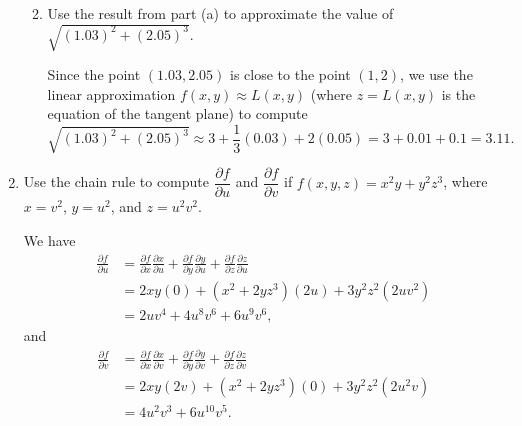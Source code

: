 \documentclass[12pt]{article}
\newcommand{\points}[1]{\marginpar{\hspace{24pt}[#1]}}
\begin{document}
\begin{enumerate}
\begin{enumerate}
\bigskip

\bigskip

\item Use the result from part (a) to approximate the value of $\sqrt{(1.03)^2+(2.05)^3}$. \points{2}

\bigskip

Since the point $(1.03, 2.05)$ is close to the point $(1,2)$, we use the linear approximation $f(x,y)\approx L(x,y)$ (where $z=L(x,y)$ is the equation of the tangent plane) to compute
\[
 \sqrt{(1.03)^2+(2.05)^3}\approx 3+\frac{1}{3}(0.03)+2(0.05) = 3+0.01+0.1 = 3.11.
\]

\end{enumerate} 

\bigskip


\item Use the chain rule to compute $\dfrac{\partial f}{\partial u}$ and $\dfrac{\partial f}{\partial v}$ if $f(x,y,z) = x^2y+y^2z^3$, where $x = v^2$, $y=u^2$, and $z=u^2v^2$. \points{5}

\bigskip

We have
\begin{align*}
 \frac{\partial f}{\partial u} & = \frac{\partial f}{\partial x}\frac{\partial x}{\partial u} + \frac{\partial f}{\partial y}\frac{\partial y}{\partial u} + \frac{\partial f}{\partial z}\frac{\partial z}{\partial u}\\
& = 2xy(0)+ (x^2+2yz^3)(2u) + 3y^2z^2(2uv^2)\\
& = 2uv^4+4u^8v^6+6u^9v^6,
\end{align*}
and
\begin{align*}
 \frac{\partial f}{\partial v} & = \frac{\partial f}{\partial x}\frac{\partial x}{\partial v} + \frac{\partial f}{\partial y}\frac{\partial y}{\partial v} + \frac{\partial f}{\partial z}\frac{\partial z}{\partial v}\\
 & = 2xy(2v)+(x^2+2yz^3)(0)+3y^2z^2(2u^2v)\\
 & = 4u^2v^3+6u^{10}v^5.
\end{align*}




\end{enumerate}
\end{document}
